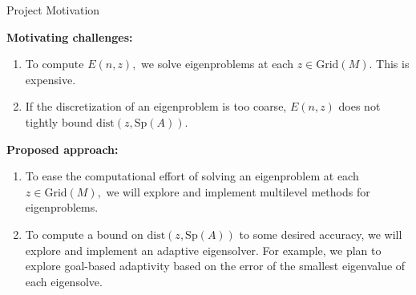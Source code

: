 \documentclass[aspectratio=169]{beamer}
\begin{document}
\begin{frame}{Project Motivation}

\textbf{Motivating challenges:}
\begin{enumerate}
    \item To compute $E(n,z),$ we solve eigenproblems at each $z \in \text{Grid}(M).$ This is expensive.
    \vspace{0.5em}
    \item If the discretization of an eigenproblem is too coarse, $E(n,z)$ does not tightly bound $\text{dist}(z, \text{Sp}(A)).$ 
\end{enumerate}

\vspace{1em}

\textbf{Proposed approach:}
\begin{enumerate}
    \item To ease the computational effort of solving an eigenproblem at each $z \in \text{Grid}(M),$ we will explore and implement multilevel methods for eigenproblems.
    \vspace{0.5em}
    \item To compute a bound on $\text{dist}(z, \text{Sp}(A))$ to some desired accuracy, we will explore and implement an adaptive eigensolver. For example,  we plan to explore goal-based adaptivity based on the error of the smallest eigenvalue of each eigensolve.
\end{enumerate}




\end{frame}
\end{document}
